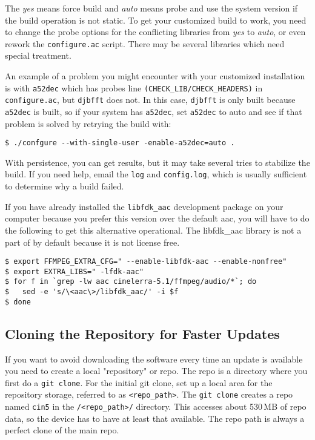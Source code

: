 The \textit{yes} means force build and \textit{auto} means probe and use the system version if the build operation is not static.  
To get your customized build to work, you need to change the probe options for the conflicting libraries from \textit{yes} to \textit{auto}, or even rework the \texttt{configure.ac} script.  
There may be several libraries which need special treatment.

An example of a problem you might encounter with your customized installation is with \texttt{a52dec} which has probes line \texttt{(CHECK\_LIB/CHECK\_HEADERS)} in \texttt{configure.ac}, but \texttt{djbfft} does not.  
In this case, \texttt{djbfft} is only built because \texttt{a52dec} is built, so if your system has \texttt{a52dec}, set \texttt{a52dec} to auto and see if that problem is solved by retrying the build with:  
\begin{lstlisting}[numbers=none]
$ ./confgure --with-single-user -enable-a52dec=auto .
\end{lstlisting}

With persistence, you can get results, but it may take several tries to stabilize the build.  
If you need help, email the \texttt{log} and \texttt{config.log}, which is usually sufficient to determine why a build failed.

If you have already installed the \texttt{libfdk\_aac} development package on your computer because you prefer this version over the default aac, you will have to do the following to get this alternative operational. The libfdk\_aac library is not a part of \CGG{} by default because it is not license free.

\begin{lstlisting}[numbers=none]
$ export FFMPEG_EXTRA_CFG=" --enable-libfdk-aac --enable-nonfree"
$ export EXTRA_LIBS=" -lfdk-aac"
$ for f in `grep -lw aac cinelerra-5.1/ffmpeg/audio/*`; do
$   sed -e 's/\<aac\>/libfdk_aac/' -i $f
$ done
\end{lstlisting}

\subsection{Cloning the Repository for Faster Updates}%
\label{sub:cloning_the_repository_for_faster_updates}

If you want to avoid downloading the software every time an update is available you need to create a local "repository" or repo.  
The repo is a directory where you first do a \texttt{git clone}.  
For the initial git clone, set up a local area for the repository storage, referred to as \texttt{<repo\_path>}.  
The \texttt{git clone} creates a repo named \texttt{cin5} in the \texttt{/<repo\_path>/} directory.  
This accesses about 530\,MB of repo data, so the device has to have at least that available.  
The repo path is always a perfect clone of the main repo.

